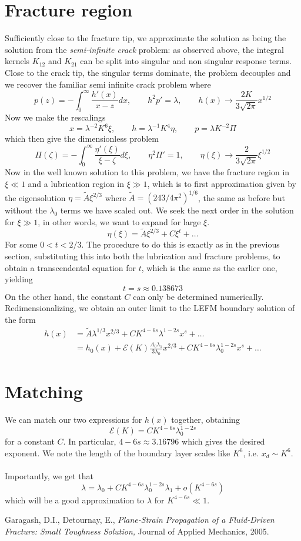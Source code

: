 \documentclass{article}
\newcommand{\cE}{\mathcal{E}}                               %
\begin{document}
\section{Fracture region}
Sufficiently close to the fracture tip, we approximate the solution as being
the solution from the \emph{semi-infinite crack} problem: as observed above, 
the integral kernels $K_{12}$ and $K_{21}$ can be split into singular and
non singular response terms. Close to the crack tip, the singular terms 
dominate, the problem decouples and we recover the familiar semi infinite
crack problem where
\[ p(z) = - \int_0^{\infty} \frac{h'(x)}{x-z} dx, \qquad
h^2p'=\lambda, \qquad h(x) \to \frac{2K}{3\sqrt{2\pi}} x^{1/2} \]
Now we make the rescalings
\[ x = \lambda^{-2}K^6 \xi, \qquad h = \lambda^{-1}K^4 \eta, \qquad
p=\lambda K^{-2} \Pi \]
which then give the dimensionless problem
\[ \Pi(\zeta) = -\int_0^{\infty}\frac{\eta'(\xi)}{\xi - \zeta} d\xi, \qquad
\eta^2 \Pi'=1, \qquad \eta(\xi) \to \frac{2}{3\sqrt{2\pi}}\xi^{1/2} \]
Now in the well known solution to this problem, we have the fracture region
in $\xi \ll 1$ and a lubrication region in $\xi \gg 1$, which is to first
approximation given by the eigensolution $\eta=\tilde{A}\xi^{2/3}$ where
$\tilde{A} = (243/4\pi^2)^{1/6}$, the same as before but without the 
$\lambda_0$ terms we have scaled out. We seek the next order in the solution
for $\xi \gg 1$, in other words, we want to expand for large $\xi$.
\[ \eta(\xi) = \tilde{A}\xi^{2/3} + C \xi^t + \dots\]
For some $0<t<2/3$. The procedure to do this is exactly as in the previous 
section, substituting this into both the lubrication and fracture problems, 
to obtain a transcendental equation for $t$, which is the same as the 
earlier one, yielding
\[t=s\approx 0.138673\]
On the other hand, the constant $C$ can only be determined numerically.
Redimensionalizing, we obtain an outer limit to the LEFM boundary solution
of the form 
\begin{align*}
h(x) &= \tilde{A} \lambda^{1/3} x^{2/3} + CK^{4-6s}\lambda^{1-2s}
x^s + \dots \\
&= h_0(x) + \cE(K) \frac{A_0 \lambda_1}{3\lambda_0} x^{2/3}
+CK^{4-6s} \lambda_0^{1-2s}x^{s} + \dots 
\end{align*}
%
\section{Matching}
We can match our two expressions for $h(x)$ together, obtaining 
\[ \cE(K) = CK^{4-6s}\lambda_0^{1-2s} \]
for a constant $C$. In particular, $4-6s \approx 3.16796$ which gives
the desired exponent. We note the length of the boundary layer scales like
$K^6$, i.e. $x_d \sim K^6$. 
\\
\\
Importantly, we get that 
\[ \lambda = \lambda_0 + C K^{4-6s} \lambda_0^{1-2s} \lambda_1 + o(K^{4-6s})\]
which will be a good approximation to $\lambda$ for $K^{4-6s} \ll 1$.
%
%
\begin{thebibliography}{9}  
%
Garagash, D.I., Detournay, E.,
\emph{Plane-Strain Propagation of a Fluid-Driven Fracture: Small Toughness
Solution,}
Journal of Applied Mechanics,
2005.
%
%
\end{thebibliography}
\end{document}
